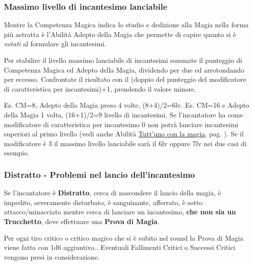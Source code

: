 \begin{multicols}{2}

\subsubsection{Massimo livello di incantesimo lanciabile}\hypertarget{scuoleelivelli}{}\label{magieaccessoallelistedimagia}\label{scuoleelivelli}

Mentre la Competenza Magica indica lo studio e dedizione alla Magia nella forma più astratta è l'Abilità Adepto della Magia che permette di capire quanto si è \emph{votati} al formulare gli incantesimi. 

Per stabilire il livello massimo lanciabile di incantesimi sommate il punteggio di Competenza Magica ed Adepto della Magia, dividendo per due ed arrotondando per eccesso. Confrontate il risultato con il (doppio del punteggio del modificatore di caratteristica per incantesimi)+1, prendendo il valore minore.

Es. CM=8, Adepto della Magia preso 4 volte, (8+4)/2=6lv. Es. CM=16 e Adepto della Magia 1 volta, (16+1)/2=9 livello di incantesimi. 
Se l'incantatore ha come modificatore di caratteristica per incantesimo 0 non potrà lanciare incantesimi superiori al primo livello (vedi anche Abilità \hyperlink{Tutt'uno con la magia}{Tutt'uno con la magia}, pag. \pageref{Tutt'uno con la magia}). 
Se il modificatore è 3 il massimo livello lanciabile sarà il 6lv oppure 7lv nei due casi di esempio.

\subsubsection{Distratto - Problemi nel lancio dell'incantesimo}\label{magiedistratto}

Se l'incantatore è \textbf{Distratto}, cerca di nascondere il lancio della magia, è impedito, severamente disturbato, è sanguinante, afferrato, è sotto attacco/minacciato mentre cerca di lanciare un incantesimo, \textbf{che non sia un Trucchetto}, deve effettuare una \textbf{Prova di Magia}.

Per ogni tiro critico o critico magico che si è subito nel round la Prova di Magia viene fatta con 1d6 aggiuntivo.. Eventuali Fallimenti Critici o Successi Critici vengono presi in considerazione.


\end{multicols}
